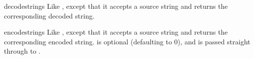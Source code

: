 \begin{funcdesc}{decodestring}{s}
Like , except that it accepts a source string and
returns the corresponding decoded string.
\end{funcdesc}

\begin{funcdesc}{encodestring}{s}
Like , except that it accepts a source string and
returns the corresponding encoded string.   is optional
(defaulting to 0), and is passed straight through to
.
\end{funcdesc}


\begin{seealso}
\end{seealso}
